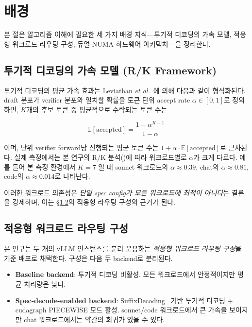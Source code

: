 
\section{배경}
\label{sec:background}

본 절은 \algname 알고리즘 이해에 필요한 세 가지 배경 지식---투기적 디코딩의 가속 모델, 적응형 워크로드 라우팅 구성, 듀얼-NUMA 하드웨어 아키텍처---을 정리한다.

\subsection{투기적 디코딩의 가속 모델 (R/K Framework)}
\label{subsec:rkframework}

투기적 디코딩의 평균 가속 효과는 Leviathan \emph{et al.}~\cite{leviathan2023spec}에 의해 다음과 같이 형식화된다.
draft 분포가 verifier 분포와 일치할 확률을 토큰 단위 accept rate $\alpha \in [0,1]$로 정의하면, $K$개의 후보 토큰 중 평균적으로 수락되는 토큰 수는

\begin{equation}
\mathbb{E}[\text{accepted}] = \frac{1-\alpha^{K+1}}{1-\alpha}
\label{eq:accept-expected}
\end{equation}

이며, 단위 verifier forward당 진행되는 평균 토큰 수는 $1 + \alpha \cdot \mathbb{E}[\text{accepted}]$로 근사된다.
실제 측정에서는 본 연구의 R/K 분석(\cite{leviathan2023spec, li2024eagle})에 따라 워크로드별로 $\alpha$가 크게 다르다.
예를 들어 본 측정 환경에서 $K=7$ 일 때 sonnet 워크로드의 $\alpha \approx 0.39$, chat의 $\alpha \approx 0.81$, code의 $\alpha \approx 0.014$로 나타난다.

이러한 워크로드 의존성은 \emph{단일 spec config가 모든 워크로드에 최적이 아니다}는 결론을 강제하며, 이는 \S\ref{subsec:agsd}의 적응형 라우팅 구성의 근거가 된다.

\subsection{적응형 워크로드 라우팅 구성}
\label{subsec:agsd}

본 연구는 두 개의 vLLM 인스턴스를 분리 운용하는 \emph{적응형 워크로드 라우팅 구성}을 기준 배포로 채택한다.
구성은 다음 두 backend로 분리된다.

\begin{itemize}
  \item \textbf{Baseline backend}: 투기적 디코딩 비활성. 모든 워크로드에서 안정적이지만 평균 처리량은 낮다.
  \item \textbf{Spec-decode-enabled backend}: SuffixDecoding~\cite{snowflake-arctic} 기반 투기적 디코딩 + cudagraph PIECEWISE 모드 활성. sonnet/code 워크로드에서 큰 가속을 보이지만 chat 워크로드에서는 약간의 회귀가 있을 수 있다.
\end{itemize}

